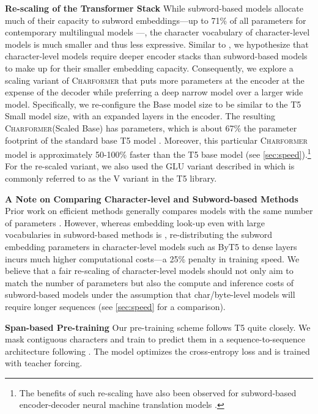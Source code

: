 \documentclass{article} \usepackage{iclr2022_conference,times}
\newcommand{\charformer}{\textsc{Charformer}\xspace}
\newcommand{\charformertall}{\textsc{Charformer}\xspace}
\begin{document}
\noindent \textbf{Re-scaling of the Transformer Stack}  While subword-based models allocate much of their capacity to subword embeddings---up to 71\% of all parameters for contemporary multilingual models \citep{Chung2021rembert}---, the character vocabulary of character-level models is much smaller and thus less expressive. Similar to \citet{Xue2021byt5}, we hypothesize that character-level models require deeper encoder stacks than subword-based models to make up for their smaller embedding capacity. 
Consequently, we explore a scaling variant of \charformer that puts more parameters at the encoder at the expense of the decoder while preferring a deep narrow model over a larger wide model. Specifically, we re-configure the Base model size to be similar to the T5 Small model size, with an expanded  layers in the encoder. The resulting \charformertall (Scaled Base) has  parameters, which is about 67\% the parameter footprint of the standard base T5 model \citep[200M parameters;][]{Raffel2020t5}. Moreover, this particular \charformer model is approximately 50-100\% faster than the T5 base model (see \textsection \ref{sec:speed}).\footnote{The benefits of such re-scaling have also been observed for subword-based encoder-decoder neural machine translation models \citep{devlin2017sharp,Kasai2021}.} For the re-scaled variant, we also used the GLU variant described in \citep{shazeer2020glu} which is commonly referred to as the V variant in the T5 library.



\noindent \textbf{A Note on Comparing Character-level and Subword-based Methods}  Prior work on efficient methods generally compares models with the same number of parameters \citep{Chung2021rembert}. However, whereas embedding look-up even with large vocabularies in subword-based methods is , re-distributing the subword embedding parameters in character-level models such as ByT5 \citep{Xue2021byt5} to dense layers incurs much higher computational costs---a 25\% penalty in training speed.
We believe that a fair re-scaling of character-level models should not only aim to match the number of parameters but also the compute and inference costs of subword-based models under the assumption that char/byte-level models will require longer sequences (see \textsection \ref{sec:speed} for a comparison).



\noindent \textbf{Span-based Pre-training}  Our pre-training scheme follows T5 quite closely. We mask  contiguous characters and train to predict them in a sequence-to-sequence architecture following \citet{Xue2021byt5}. The model optimizes the cross-entropy loss and is trained with teacher forcing.
\end{document}
